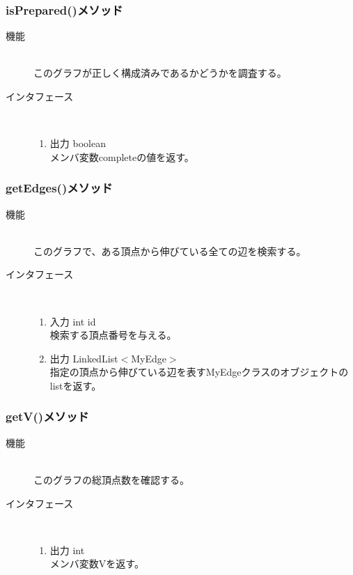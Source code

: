 \documentclass[a4j]{jarticle}
\begin{document}
\begin{description}
\begin{description}
\subsubsection{isPrepared()メソッド}

\begin{description}
\item[機能]\mbox{}\\
このグラフが正しく構成済みであるかどうかを調査する。

\item[インタフェース]\
  \begin{enumerate}
  \item 出力 boolean\mbox{}\\
    メンバ変数completeの値を返す。
  \end{enumerate}
\end{description}

\subsubsection{getEdges()メソッド}

\begin{description}
\item[機能]\mbox{}\\
このグラフで、ある頂点から伸びている全ての辺を検索する。

\item[インタフェース]\
  \begin{enumerate}
  \item 入力 int id\mbox{}\\
    検索する頂点番号を与える。
  \item 出力 LinkedList$<$MyEdge$>$\mbox{}\\
    指定の頂点から伸びている辺を表すMyEdgeクラスのオブジェクトのlistを返す。 
  \end{enumerate}
\end{description}

\subsubsection{getV()メソッド}

\begin{description}
\item[機能]\mbox{}\\
このグラフの総頂点数を確認する。
\item[インタフェース]\
  \begin{enumerate}
  \item 出力 int\mbox{}\\
    メンバ変数Vを返す。
  \end{enumerate}
\end{description}


\end{description}
\end{description}
\end{document}
